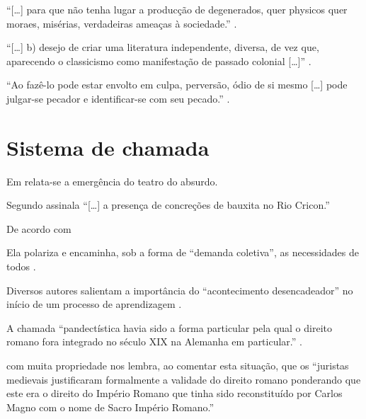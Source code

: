 \documentclass[a4paper]{article}
\begin{document}
\enquote{[\ldots] para que não tenha lugar a producção de degenerados, quer
physicos quer moraes, misérias, verdadeiras ameaças à sociedade.} \cite[p. 46,
grifo nosso]{souto1916}.

\enquote{[\ldots] b) desejo de criar uma literatura independente, diversa, de
vez que, aparecendo o classicismo como manifestação de passado colonial
[\ldots]} \cite[v. 2, p. 12, grifo do autor]{candido1993}.

\enquote{Ao fazê-lo pode estar envolto em culpa, perversão, ódio de si mesmo
[\ldots] pode julgar-se pecador e identificar-se com seu pecado.} \cite[v. 4,
p. 463, tradução nossa]{rahner1962}.


\section{Sistema de chamada}

Em  relata-se a emergência do teatro do absurdo.

Segundo \textcite[32]{morais1955} assinala \enquote{[\ldots] a presença de
concreções de bauxita no Rio Cricon.}

\cite{barbosa1958}

\cite{barbosa1959}

\cite{barbosa1965a}

\cite{barbosa1965b}

De acordo com \textcite{reeside1927a}

\cite{reeside1927b}

\cites{dreyfuss1989}{dreyfuss1991}{dreyfuss1995}

\cites{cruz1998}{cruz1999}{cruz2000}

Ela polariza e encaminha, sob a forma de \enquote{demanda coletiva}, as
necessidades de todos \cites{fonseca1997}{paiva1997}{silva1997}.

Diversos autores salientam a importância do \enquote{acontecimento
desencadeador} no início de um processo de aprendizagem
\cites{cross1984}{knox1986}{mezirow1991}.

A chamada \enquote{pandectística havia sido a forma particular pela qual
o direito romano fora integrado no século XIX na Alemanha em particular.}
\cite[225]{lopes2000}.

\textcite[30]{bobbio1995} com muita propriedade nos lembra, ao comentar esta
situação, que os \enquote{juristas medievais justificaram formalmente
  a validade do direito romano ponderando que este era o direito do Império
  Romano que tinha sido reconstituído por Carlos Magno com o nome de Sacro
Império Romano.}
\end{document}
